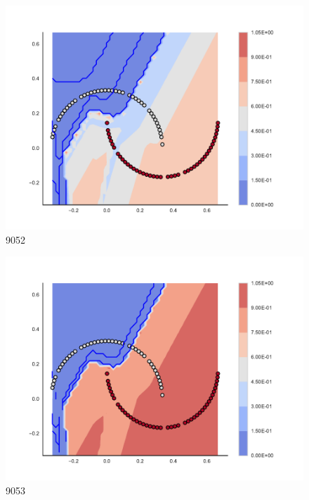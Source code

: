 \begin{subfigure}[b]{0.09\textwidth}
    \includegraphics[clip, trim=2.35cm 1.75cm 4.5cm 0cm,width=\textwidth]{img/convergence/9052.pdf}
    \caption{9052}
    \label{fig:convergence_9052}
\end{subfigure}
%
\begin{subfigure}[b]{0.09\textwidth}
    \includegraphics[clip, trim=2.35cm 1.75cm 4.5cm 0cm,width=\textwidth]{img/convergence/9053.pdf}
    \caption{9053}
    \label{fig:convergence_9053}
\end{subfigure}
%
